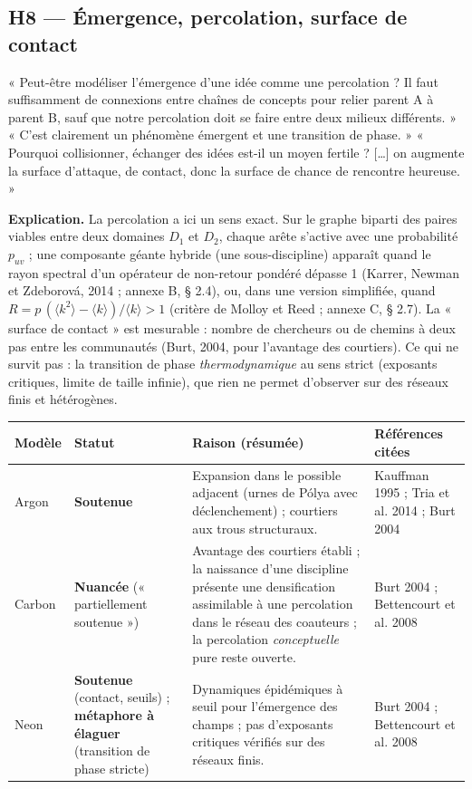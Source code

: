 \documentclass[a4paper,11pt]{article}
\makeatletter
\newenvironment{avis}{\small\renewcommand{\arraystretch}{1.15}%
\begin{longtable}{@{}>{\raggedright\arraybackslash}p{1.35cm}>{\raggedright\arraybackslash}p{2.45cm}>{\raggedright\arraybackslash}p{7.15cm}>{\raggedright\arraybackslash}p{4.4cm}@{}}
\toprule \textbf{Modèle} & \textbf{Statut} & \textbf{Raison (résumée)} & \textbf{Références citées}\\ \midrule \endhead
\bottomrule \endfoot}{\end{longtable}}
\newcommand{\st}[1]{\textbf{#1}}
\makeatother
\begin{document}
\subsection{H8 — Émergence, percolation, surface de contact}
\begin{enonce}
« Peut-être modéliser l'émergence d'une idée comme une percolation ? Il faut suffisamment de connexions entre chaînes de concepts pour relier parent A à parent B, sauf que notre percolation doit se faire entre deux milieux différents. » « C'est clairement un phénomène émergent et une transition de phase. » « Pourquoi collisionner, échanger des idées est-il un moyen fertile ? […] on augmente la surface d'attaque, de contact, donc la surface de chance de rencontre heureuse. »
\end{enonce}

\textbf{Explication.} La percolation a ici un sens exact. Sur le graphe biparti des paires viables entre deux domaines $D_1$ et $D_2$, chaque arête s'active avec une probabilité $p_{uv}$ ; une composante géante hybride (une sous-discipline) apparaît quand le rayon spectral d'un opérateur de non-retour pondéré dépasse 1 (Karrer, Newman et Zdeborová, 2014 ; annexe B, § 2.4), ou, dans une version simplifiée, quand $R=p\,(\langle k^2\rangle-\langle k\rangle)/\langle k\rangle>1$ (critère de Molloy et Reed ; annexe C, § 2.7). La « surface de contact » est mesurable : nombre de chercheurs ou de chemins à deux pas entre les communautés (Burt, 2004, pour l'avantage des courtiers). Ce qui ne survit pas : la transition de phase \emph{thermodynamique} au sens strict (exposants critiques, limite de taille infinie), que rien ne permet d'observer sur des réseaux finis et hétérogènes.

\begin{avis}
Argon & \st{Soutenue} & Expansion dans le possible adjacent (urnes de Pólya avec déclenchement) ; courtiers aux trous structuraux. & Kauffman 1995 ; Tria et al. 2014 ; Burt 2004\\ \midrule
Carbon & \st{Nuancée} (« partiellement soutenue ») & Avantage des courtiers établi ; la naissance d'une discipline présente une densification assimilable à une percolation dans le réseau des coauteurs ; la percolation \emph{conceptuelle} pure reste ouverte. & Burt 2004 ; Bettencourt et al. 2008\\ \midrule
Neon & \st{Soutenue} (contact, seuils) ; \st{métaphore à élaguer} (transition de phase stricte) & Dynamiques épidémiques à seuil pour l'émergence des champs ; pas d'exposants critiques vérifiés sur des réseaux finis. & Burt 2004 ; Bettencourt et al. 2008\\
\end{avis}
\end{document}

